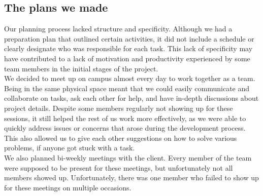 


\subsection{The plans we made}

Our planning process lacked structure and specificity. Although we had a preparation plan that outlined certain activities, it did not include a schedule or clearly designate who was responsible for each task. This lack of specificity may have contributed to a lack of motivation and productivity experienced by some team members in the initial stages of the project. \\

\noindent
We decided to meet up on campus almost every day to work together as a team. Being in the same physical space meant that we could easily communicate and collaborate on tasks, ask each other for help, and have in-depth discussions about project details. Despite some members regularly not showing up for these sessions, it still helped the rest of us work more effectively, as we were able to quickly address issues or concerns that arose during the development process. This also allowed us to give each other suggestions on how to solve various problems, if anyone got stuck with a task. \\

\noindent
We also planned bi-weekly meetings with the client. Every member of the team were supposed to be present for these meetings, but unfortunately not all members showed up. Unfortunately, there was one member who failed to show up for these meetings on multiple occasions.\\

